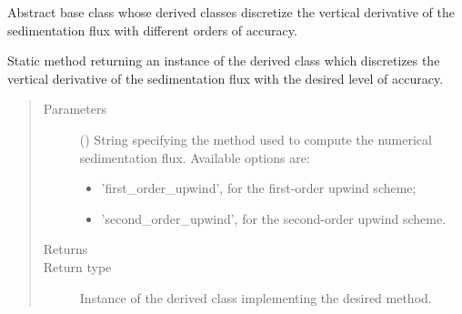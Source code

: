\documentclass[letterpaper,10pt,english]{sphinxmanual}
\begin{document}
\begin{fulllineitems}
\label{\detokenize{api:dycore.flux_sedimentation.FluxSedimentation}}
Abstract base class whose derived classes discretize the vertical derivative of the sedimentation flux
with different orders of accuracy.

\begin{fulllineitems}
\label{\detokenize{api:dycore.flux_sedimentation.FluxSedimentation.factory}}
Static method returning an instance of the derived class which discretizes the vertical derivative of
the sedimentation flux with the desired level of accuracy.
\begin{quote}\begin{description}
\item[{Parameters}] \leavevmode
{} () \textendash{} 
String specifying the method used to compute the numerical sedimentation flux. Available options are:
\begin{itemize}
\item {} 
’first\_order\_upwind’, for the first-order upwind scheme;

\item {} 
’second\_order\_upwind’, for the second-order upwind scheme.

\end{itemize}


\item[{Returns}] \leavevmode


\item[{Return type}] \leavevmode
Instance of the derived class implementing the desired method.

\end{description}\end{quote}

\end{fulllineitems}



\end{fulllineitems}
\end{document}
